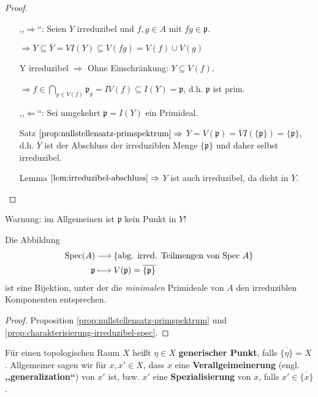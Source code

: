 \begin{proof} \mbox{}
  \begin{itemize}
  \item [,,$\Rightarrow$``:]
    Seien $Y$ irreduzibel und $f,g\in A$ mit $fg\in\mathfrak{p}$.

    $\Rightarrow Y\subseteq\overline{Y}=VI(Y)\subseteq V(fg)=V(f)\cup V(g)$

    Y irreduzibel $\Rightarrow$ Ohne Einschränkung: $Y\subseteq V(f)$.

    $\Rightarrow
    f\in\bigcap_{y \in V(f)}\mathfrak{p}_{y}=IV(f)\subseteq
    I(Y)=\mathfrak{p}$, d.h. $\mathfrak{p}$ ist prim.
  \item[,,$\Leftarrow$``:] Sei umgekehrt $\mathfrak{p}=I(Y)$ ein Primideal.

    Satz $\ref{prop:nullstellensatz-primspektrum} \Rightarrow$
    $\overline{Y}=V(\mathfrak{p})=VI(\{\mathfrak{p}\})=\overline{\{\mathfrak{p}\}}$,
    d.h. $\overline{Y}$ ist der Abschluss der irreduziblen Menge
    $\{\mathfrak{p}\}$ und daher selbst irreduzibel.

    Lemma $\ref{lem:irreduzibel-abschluss} \Rightarrow$ $Y$ ist auch irreduzibel, da dicht in
    $\overline{Y}$.
  \end{itemize}
\end{proof}
Warnung: im Allgemeinen ist $\mathfrak{p}$ kein Punkt in $Y$!

\begin{cor}
\label{cor:bijektion-spec-irreduzible-abg-teilmengen}
  Die Abbildung
  \begin{align*}
    \operatorname{Spec}(A) & \longrightarrow\text{\{abg. irred. Teilmengen von Spec }A\}\\
    \mathfrak{p} & \longmapsto V(\mathfrak{p})=\overline{\{\mathfrak{p}\}}
  \end{align*}
  ist eine Bijektion, unter der die \emph{minimalen} Primideale von $A$ den
  irreduziblen Komponenten entsprechen.
\end{cor}

\begin{proof} Proposition \ref{prop:nullstellensatz-primspektrum} und \ref{prop:charakterisierung-irreduzibel-spec}.
\end{proof}

\begin{defn}
\label{def:gernerische-punkte}	
  Für einen topologischen Raum $X$ heißt $\eta\in X$
  \textbf{generischer Punkt}, falls
  $\overline{\{\eta\}}=X$. Allgemeiner sagen wir für $x,x'\in X$, dass
  $x$ eine \textbf{Verallgeimeinerung} (engl. \textbf{,,generalization``}) von $x'$ ist,
  bzw. $x'$ eine \textbf{Spezialisierung} von $x$, falls
  $x'\in\overline{\{x\}}$.
\end{defn}

